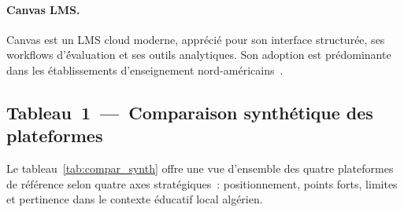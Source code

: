 \documentclass[12pt,a4paper,oneside]{report}
\begin{document}
\paragraph{Canvas LMS.}
Canvas est un LMS cloud moderne, appr\'eci\'e pour son interface structur\'ee, ses workflows d'\'évaluation et ses outils analytiques. Son adoption est pr\'edominante dans les établissements d'enseignement nord-am\'ericains~\cite{canvas_overview_2026}.

\subsection{Tableau~1~---~Comparaison synth\'etique des plateformes}

Le tableau~\ref{tab:compar_synth} offre une vue d'ensemble des quatre plateformes de r\'ef\'erence selon quatre axes strat\'egiques~: positionnement, points forts, limites et pertinence dans le contexte éducatif local algérien.
\end{document}
